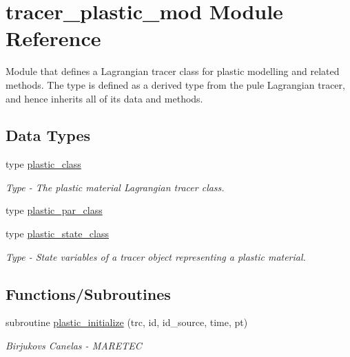 \hypertarget{namespacetracer__plastic__mod}{}\section{tracer\+\_\+plastic\+\_\+mod Module Reference}
\label{namespacetracer__plastic__mod}


Module that defines a Lagrangian tracer class for plastic modelling and related methods. The type is defined as a derived type from the pule Lagrangian tracer, and hence inherits all of it\textquotesingle{}s data and methods.  


\subsection*{Data Types}
\begin{DoxyCompactItemize}
\item 
type \hyperlink{structtracer__plastic__mod_1_1plastic__class}{plastic\+\_\+class}
\begin{DoxyCompactList}\small\item\em Type -\/ The plastic material Lagrangian tracer class. \end{DoxyCompactList}\item 
type \hyperlink{structtracer__plastic__mod_1_1plastic__par__class}{plastic\+\_\+par\+\_\+class}
\item 
type \hyperlink{structtracer__plastic__mod_1_1plastic__state__class}{plastic\+\_\+state\+\_\+class}
\begin{DoxyCompactList}\small\item\em Type -\/ State variables of a tracer object representing a plastic material. \end{DoxyCompactList}\end{DoxyCompactItemize}
\subsection*{Functions/\+Subroutines}
\begin{DoxyCompactItemize}
\item 
subroutine \hyperlink{namespacetracer__plastic__mod_a42882cd86cfe30f341d8150582a664a9}{plastic\+\_\+initialize} (trc, id, id\+\_\+source, time, pt)
\begin{DoxyCompactList}\small\item\em Birjukovs Canelas -\/ M\+A\+R\+E\+T\+EC \end{DoxyCompactList}\end{DoxyCompactItemize}


